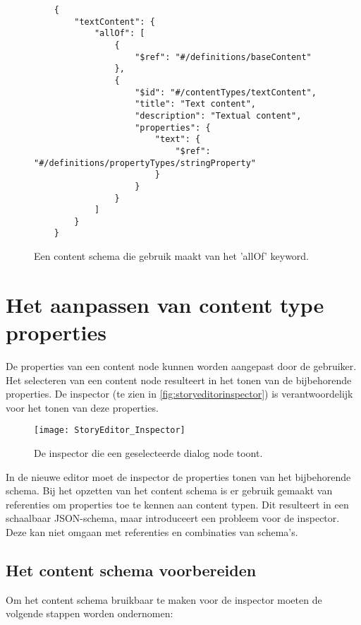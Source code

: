 \begin{figure}[htb]
    \centering
    \lstset{language=JSON}
    \begin{lstlisting}
    {
        "textContent": {
            "allOf": [
                {
                    "$ref": "#/definitions/baseContent"
                },
                {
                    "$id": "#/contentTypes/textContent",
                    "title": "Text content",
                    "description": "Textual content",
                    "properties": {
                        "text": {
                            "$ref": "#/definitions/propertyTypes/stringProperty"
                        }
                    }
                }
            ]
        }
    }
    \end{lstlisting}
    \caption{Een content schema die gebruik maakt van het 'allOf' keyword.}
    \label{fig:jsonschemaallofexample}
\end{figure}

\section{Het aanpassen van content type properties}
De properties van een content node kunnen worden aangepast door de gebruiker. Het selecteren van een content node resulteert in het tonen van de bijbehorende properties. De inspector (te zien in \autoref{fig:storyeditorinspector}) is verantwoordelijk voor het tonen van deze properties.

\begin{figure}[htb]
    \texttt{[image: StoryEditor\_Inspector]}
    \caption{De inspector die een geselecteerde dialog node toont.}
    \label{fig:storyeditorinspector}
    \centering
\end{figure}

In de nieuwe editor moet de inspector de properties tonen van het bijbehorende schema. Bij het opzetten van het content schema is er gebruik gemaakt van referenties om properties toe te kennen aan content typen. Dit resulteert in een schaalbaar JSON-schema, maar introduceert een probleem voor de inspector. Deze kan niet omgaan met referenties en combinaties van schema’s.

\subsection{Het content schema voorbereiden}
Om het content schema bruikbaar te maken voor de inspector moeten de volgende stappen worden ondernomen:

